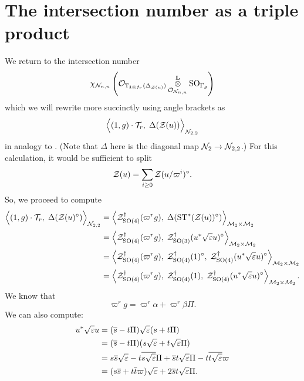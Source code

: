 \section{The intersection number as a triple product}
We return to the intersection number
\[ \chi_{\mathcal N_{n,n}} \left(
      \mathcal{O}_{\mathbb T_{\mathbf{1} \otimes f_r}(\Delta_{\mathcal Z(u)})}
      \mathop{\otimes}^{\mathbf{L}}_{\mathcal{O}_{\mathcal N_{n,n}}} \operatorname{SO}_{\Gamma_g} \right) \]
which we will rewrite more succinctly using angle brackets as
\[ \Big\langle (1,g) \cdot \mathcal{T}_r, \; \Delta(\mathcal Z(u)) \Big\rangle_{\mathcal N_{2,2}} \]
in analogy to \cite[\S6.1]{ref:AFLspherical}.
(Note that $\Delta$ here is the diagonal map $\mathcal N_2 \to \mathcal N_{2,2}$.)
For this calculation, it would be sufficient to split
\[ \mathcal Z(u) = \sum_{i \ge 0} \mathcal Z(u/\varpi^i)^\circ. \]
So, we proceed to compute
\begin{align*}
  \Big\langle (1,g) \cdot \mathcal{T}_r, \; \Delta(\mathcal Z(u)^\circ) \Big\rangle_{\mathcal N_{2,2}}
  &= \left< \mathcal Z^{\dagger}_{\operatorname{SO}(4)}(\varpi^r g), \; \Delta(\operatorname{ST}^\ast(\mathcal Z(u))^\circ) \right>_{\mathcal M_2 \times \mathcal M_2} \\
  &= \left< \mathcal Z^{\dagger}_{\operatorname{SO}(4)}(\varpi^r g), \; \mathcal Z^{\dagger}_{\operatorname{SO}(3)}(u^\ast \sqrt{\varepsilon} u)^\circ \right>_{\mathcal M_2 \times \mathcal M_2} \\
  &= \left< \mathcal Z^{\dagger}_{\operatorname{SO}(4)}(\varpi^r g), \; \mathcal Z^{\dagger}_{\operatorname{SO}(4)}(1)^\circ, \; \mathcal Z^{\dagger}_{\operatorname{SO}(4)}(u^\ast \sqrt{\varepsilon} u)^\circ \right>_{\mathcal M_2 \times \mathcal M_2} \\
  &= \left< \mathcal Z^{\dagger}_{\operatorname{SO}(4)}(\varpi^r g), \; \mathcal Z^{\dagger}_{\operatorname{SO}(4)}(1), \; \mathcal Z^{\dagger}_{\operatorname{SO}(4)}(u^\ast \sqrt{\varepsilon} u)^\circ \right>_{\mathcal M_2 \times \mathcal M_2}.
\end{align*}
We know that
\[ \varpi^r g = \varpi^r \alpha + \varpi^r \beta \Pi. \]
We can also compute:
\begin{align*}
  u^\ast \sqrt{\varepsilon} u
  &= (\overline s - t \Pi) \sqrt{\varepsilon} (s + t \Pi) \\
  &= (\overline s - t \Pi) (s \sqrt{\varepsilon} + t \sqrt{\varepsilon} \Pi) \\
  &= s \overline s \sqrt{\varepsilon} - t \overline{s\sqrt{\varepsilon}} \Pi + \overline s t \sqrt{\varepsilon} \Pi - t \overline{t \sqrt{\varepsilon}} \varpi \\
  &= (s \overline s + t \overline t \varpi) \sqrt{\varepsilon} + 2 \overline s t \sqrt{\varepsilon} \Pi.
\end{align*}

